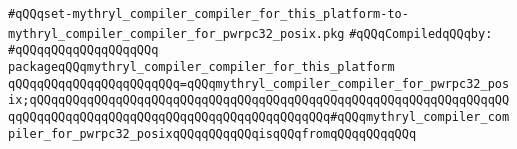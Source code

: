 \label{src/lib/core/mythryl-compiler-compiler/set-mythryl_compiler_compiler_for_this_platform-to-mythryl_compiler_compiler_for_pwrpc32_posix.pkg}
\verb|#qQQqset-mythryl_compiler_compiler_for_this_platform-to-mythryl_compiler_compiler_for_pwrpc32_posix.pkg|\newline
\newline
\verb|#qQQqCompiledqQQqby:|\newline
\verb|#qQQqqQQqqQQqqQQqqQQq|\newline
\newline
\verb|packageqQQqmythryl_compiler_compiler_for_this_platform|\newline
\verb|qQQqqQQqqQQqqQQqqQQqqQQq=qQQqmythryl_compiler_compiler_for_pwrpc32_posix;qQQqqQQqqQQqqQQqqQQqqQQqqQQqqQQqqQQqqQQqqQQqqQQqqQQqqQQqqQQqqQQqqQQqqQQqqQQqqQQqqQQqqQQqqQQqqQQqqQQqqQQqqQQqqQQq#qQQqmythryl_compiler_compiler_for_pwrpc32_posixqQQqqQQqqQQqisqQQqfromqQQqqQQqqQQq|\newline

